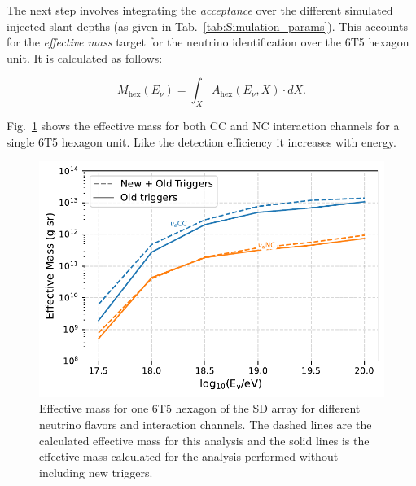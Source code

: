 The next step involves integrating the \textit{acceptance} over the different simulated injected slant depths (as given in Tab.~\ref{tab:Simulation_params}). This accounts for the \textit{effective mass} target for the neutrino identification over the 6T5 hexagon unit. It is calculated as follows: 

\begin{equation}
  \label{eq:nu_eff_mass}
  M_{\text{hex}}(E_{\nu}) = \int_X A_{\text{hex}}(E_{\nu}, X) \cdot dX.
\end{equation}

Fig.~\ref{fig:EffMass_flavors_comp} shows the effective mass for both CC and NC interaction channels for a single 6T5 hexagon unit. Like the detection efficiency it increases with energy. 

\begin{figure}[t!]
  \centering
  \includegraphics[width=14.5cm]{thesis_figures/ExpLimits/EffMass_comp_all_new_sim_optim.pdf}
  \caption{Effective mass for one 6T5 hexagon of the SD array for different neutrino flavors and interaction channels. The dashed lines are the calculated effective mass for this analysis and the solid lines is the effective mass calculated for the analysis performed without including new triggers.}
  \label{fig:EffMass_flavors_comp}
\end{figure}
